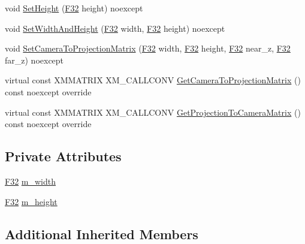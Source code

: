 \begin{DoxyCompactItemize}
void \hyperlink{classmage_1_1rendering_1_1_orthographic_camera_af9929c91c44b6226986e760012bf660c}{Set\+Height} (\hyperlink{namespacemage_aa97e833b45f06d60a0a9c4fc22ae02c0}{F32} height) noexcept
\item 
void \hyperlink{classmage_1_1rendering_1_1_orthographic_camera_a167bc797f11d1c00d3795ce7d2d1124c}{Set\+Width\+And\+Height} (\hyperlink{namespacemage_aa97e833b45f06d60a0a9c4fc22ae02c0}{F32} width, \hyperlink{namespacemage_aa97e833b45f06d60a0a9c4fc22ae02c0}{F32} height) noexcept
\item 
void \hyperlink{classmage_1_1rendering_1_1_orthographic_camera_ac6bbf8ceb2c7c02703f0b753b6475ad0}{Set\+Camera\+To\+Projection\+Matrix} (\hyperlink{namespacemage_aa97e833b45f06d60a0a9c4fc22ae02c0}{F32} width, \hyperlink{namespacemage_aa97e833b45f06d60a0a9c4fc22ae02c0}{F32} height, \hyperlink{namespacemage_aa97e833b45f06d60a0a9c4fc22ae02c0}{F32} near\+\_\+z, \hyperlink{namespacemage_aa97e833b45f06d60a0a9c4fc22ae02c0}{F32} far\+\_\+z) noexcept
\item 
virtual const X\+M\+M\+A\+T\+R\+IX X\+M\+\_\+\+C\+A\+L\+L\+C\+O\+NV \hyperlink{classmage_1_1rendering_1_1_orthographic_camera_a45736d696df0a38c8f1342dca2cda0cd}{Get\+Camera\+To\+Projection\+Matrix} () const noexcept override
\item 
virtual const X\+M\+M\+A\+T\+R\+IX X\+M\+\_\+\+C\+A\+L\+L\+C\+O\+NV \hyperlink{classmage_1_1rendering_1_1_orthographic_camera_a7d52862a3762dcaeadf26e8ae92d9d09}{Get\+Projection\+To\+Camera\+Matrix} () const noexcept override
\end{DoxyCompactItemize}
\subsection*{Private Attributes}
\begin{DoxyCompactItemize}
\item 
\hyperlink{namespacemage_aa97e833b45f06d60a0a9c4fc22ae02c0}{F32} \hyperlink{classmage_1_1rendering_1_1_orthographic_camera_ad4ef3a064f83f6896f59d1d36213d79b}{m\+\_\+width}
\item 
\hyperlink{namespacemage_aa97e833b45f06d60a0a9c4fc22ae02c0}{F32} \hyperlink{classmage_1_1rendering_1_1_orthographic_camera_abbe1fec789e544b5de8a40546ec5db92}{m\+\_\+height}
\end{DoxyCompactItemize}
\subsection*{Additional Inherited Members}


